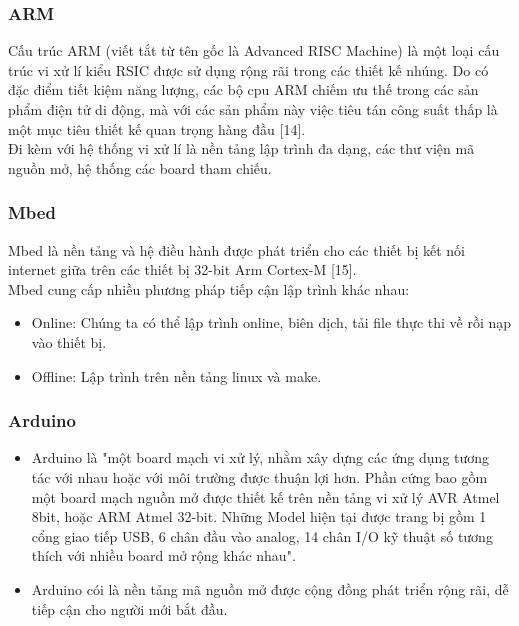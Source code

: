 \documentclass[a4paper,12pt,oneside]{article}
\begin{document}
\subsubsection{ARM}
\noindent Cấu trúc ARM (viết tắt từ tên gốc là Advanced RISC Machine) là một loại cấu trúc vi xử lí kiểu RSIC được sử dụng rộng rãi trong các thiết kế nhúng. Do có đặc điểm tiết kiệm năng lượng, các bộ cpu ARM chiếm ưu thế trong các sản phẩm điện tử di động, mà với các sản phẩm này việc tiêu tán công suất thấp là một mục tiêu thiết kế quan trọng hàng đầu [14].\\
\noindent Đi kèm với hệ thống vi xử lí là nền tảng lập trình đa dạng, các thư viện mã nguồn mở, hệ thống các board tham chiếu.

\subsubsection{Mbed}
\noindent Mbed là nền tảng và hệ điều hành được phát triển cho các thiết bị kết nối internet giữa trên các thiết bị 32-bit Arm Cortex-M [15].\\
\noindent Mbed cung cấp nhiều phương pháp tiếp cận lập trình khác nhau:
\begin{itemize}
	\item Online: Chúng ta có thể lập trình online, biên dịch, tải file thực thi về rồi nạp vào thiết bị.
	\item Offline: Lập trình trên nền tảng linux và make.
\end{itemize}

\subsubsection{Arduino}
\begin{itemize}
\item Arduino là "một board mạch vi xử lý, nhằm xây dựng các ứng dụng tương tác với nhau hoặc với môi trường được thuận lợi hơn. Phần cứng bao gồm một board mạch nguồn mở được thiết kế trên nền tảng vi xử lý AVR Atmel 8bit, hoặc ARM Atmel 32-bit. Những Model hiện tại được trang bị gồm 1 cổng giao tiếp USB, 6 chân đầu vào analog, 14 chân I/O kỹ thuật số tương thích với nhiều board mở rộng khác nhau"\cite{arduino}.
\item Arduino cói là nền tảng mã nguồn mở được cộng đồng phát triển rộng rãi, dễ tiếp cận cho người mới bắt đầu.
\end{itemize}
\end{document}

